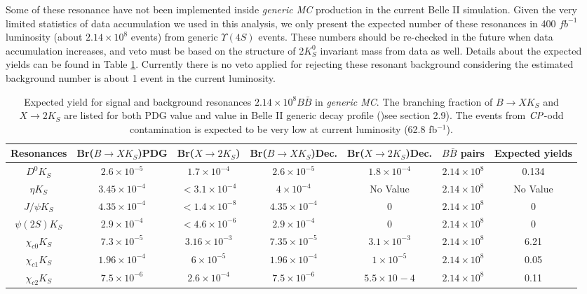  Some of these resonance have not been implemented inside \textit{generic MC} production in the current Belle II simulation. Given the very limited statistics of data accumulation we used in this analysis, we only present the expected number of these resonances in 400 $fb^{-1}$ luminosity (about $2.14 \times 10^8$ events) from generic $\Upsilon{(4S)}$ events. These numbers should be re-checked in the future when data accumulation increases, and veto must be based on the structure of 2$K_S^0$ invariant mass from data as well. Details about the expected yields can be found in Table \ref{tab:f_res}. Currently there is no veto applied for rejecting these resonant background considering the estimated background number is about 1 event in the current luminosity.
\begin{table}
	\caption{Expected yield for signal and background resonances $2.14\times 10^8 B\bar{B}$ in \textit{generic MC}. The branching fraction of $B\to X K_S$ and $X \to 2K_S$ are listed for both PDG value and value in Belle II generic decay profile ()see section 2.9). The events from $\it{CP}$-odd contamination is expected to be very low at current luminosity (62.8 fb$^{-1}$).}
	\label{tab:f_res}
	\centering
	\begin{tabular}{|c|c|c|c|c|c|c|}
		\hline
		Resonances & Br($B \to X K_S$)PDG  & Br($X \to2K_S$) & Br($B \to X K_S$)Dec. & Br($X \to2K_S$)Dec. & $B\bar{B}$ pairs & Expected yields \\
		\hline
		$D^0 K_S$ & $2.6 \times 10^{-5}$ & $1.7\times 10^{-4}$ & $2.6 \times 10^{-5}$ & $1.8\times 10^{-4}$ & $2.14\times 10^8$ & 0.134 \\
		\hline
		$\eta K_S$ & $3.45\times 10^{-4}$ & $<3.1\times 10^{-4}$ & $4\times 10^{-4}$ & No Value & $2.14\times 10^8$ & No Value  \\
		\hline
		$J/\psi K_S$ & $4.35\times 10^{-4}$ & $<1.4\times 10^{-8}$ & $4.35\times 10^{-4}$ & 0 & $2.14\times 10^8$ & 0 \\
		\hline
		$\psi(2S)K_S$ & $2.9\times 10^{-4}$ & $<4.6\times 10^{-6}$ & $2.9\times 10^{-4}$ & 0 & $2.14\times 10^8$ & 0 \\
		\hline
		$\chi_{c0}K_S$ & $7.3\times 10^{-5}$ & $3.16\times 10^{-3}$ & $7.35\times 10^{-5}$ & $3.1\times 10^{-3}$ & $2.14\times 10^8$ & 6.21 \\
		\hline
		$\chi_{c1}K_S$ & $1.96\times 10^{-4}$ & $6\times 10^{-5}$ & $1.96\times 10^{-4}$ & $1\times 10^{-5}$ & $2.14\times 10^8$ & 0.05 \\
		\hline
		$\chi_{c2}K_S$ & $7.5\times 10^{-6}$ & $2.6\times 10^{-4}$ & $7.5\times 10^{-6}$ & $5.5\times 10^{}-4$ & $2.14\times 10^8$ & 0.11 \\

\end{tabular}
\end{table}
